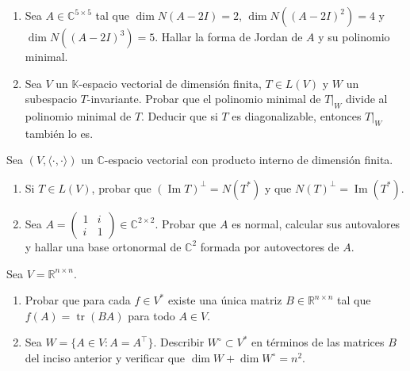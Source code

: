 \documentclass{article}
\newcommand{\R}{\mathbb{R}}
\newcommand{\C}{\mathbb{C}}
\newcommand{\K}{\mathbb{K}}
\DeclareMathOperator{\Ima}{Im}
\DeclareMathOperator{\tr}{tr}
\newcommand{\ip}[2]{\langle #1, #2\rangle}
\newenvironment{ejercicio}[1]{\begin{trivlist}
\item[\hskip \labelsep {\bfseries #1.}]}{\end{trivlist}}
\begin{document}
\begin{ejercicio}{2}
    \begin{enumerate}
        \item Sea \( A \in \C^{5 \times 5} \) tal que \( \dim N(A - 2I) = 2 \), \( \dim N((A - 2I)^2) = 4 \) y \( \dim N((A - 2I)^3) = 5 \). Hallar la forma de Jordan de \( A \) y su polinomio minimal.
        \item Sea \( V \) un \( \K \)-espacio vectorial de dimensión finita, \( T \in L(V) \) y \( W \) un subespacio \( T \)-invariante. Probar que el polinomio minimal de \( T|_W \) divide al polinomio minimal de \( T \). Deducir que si \( T \) es diagonalizable, entonces \( T|_W \) también lo es.
    \end{enumerate}
\end{ejercicio}

\begin{ejercicio}{3}
    Sea \( (V, \ip{\cdot}{\cdot}) \) un \( \C \)-espacio vectorial con producto interno de dimensión finita.
    \begin{enumerate}
        \item Si \( T \in L(V) \), probar que \( (\Ima T)^\perp = N(T^*) \) y que \( N(T)^\perp = \Ima(T^*) \).
        \item Sea \( A = \begin{pmatrix} 1 & i \\ i & 1 \end{pmatrix} \in \C^{2 \times 2} \). Probar que \( A \) es normal, calcular sus autovalores y hallar una base ortonormal de \( \C^2 \) formada por autovectores de \( A \).
    \end{enumerate}
\end{ejercicio}

\begin{ejercicio}{4}
    Sea \( V = \R^{n \times n} \).
    \begin{enumerate}
        \item Probar que para cada \( f \in V^* \) existe una única matriz \( B \in \R^{n \times n} \) tal que \( f(A) = \tr(BA) \) para todo \( A \in V \).
        \item Sea \( W = \{A \in V : A = A^\top\} \). Describir \( W^\circ \subset V^* \) en términos de las matrices \( B \) del inciso anterior y verificar que \( \dim W + \dim W^\circ = n^2 \).
    \end{enumerate}
\end{ejercicio}
\end{document}
